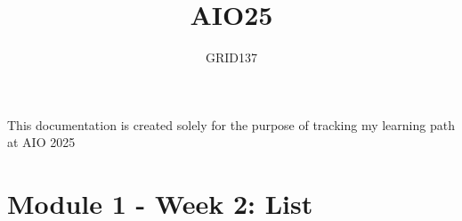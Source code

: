 \documentclass[12pt]{report}
\title{AIO25}
\author{GRID137}
\begin{document}
	
	\maketitle
	
	\begin{center}
		\large This documentation is created solely for the purpose of tracking my learning path at AIO 2025
	\end{center}
	
	\tableofcontents
	\newpage
	
	\chapter{Module 1 - Week 2: List}
	
	
\end{document}

